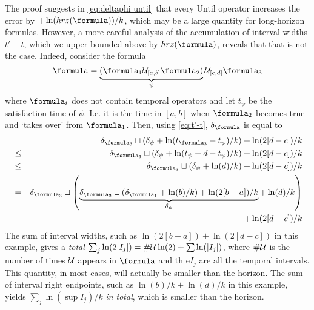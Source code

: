 \begin{rem}
	The proof suggests in \eqref{eq:deltaphi until} that every Until operator increases the error by $+\ln(hrz(\formula))/k$, which may be a large quantity for long-horizon formulas.
	However, a more careful analysis of the accumulation of interval widths $t'-t$, which we upper bounded above by $hrz(\formula)$, reveals that that is not the case.
	Indeed, consider the formula
	\[\formula = \underbrace{(\formula_1 \until_{[a,b]} \formula_2) }_{\psi}\until_{[c,d]} \formula_3\]
	where $\formula_i$ does not contain temporal operators and let $t_\psi$ be the satisfaction time of $\psi$. 
	I.e. it is the time in $[a,b]$ when $\formula_2$ becomes true and `takes over' from $\formula_1$.
	Then, using \eqref{eq:t'-t}, $\delta_{\formula}$ is equal to
	\begin{eqnarray*}
	 && \delta_{\formula_3} \sqcup ( \delta_{\psi} + \ln(t_{\formula_3} - t_\psi)/k )+ \ln(2[d-c])/k 
	\\
	&\leq& \delta_{\formula_3} \sqcup ( \delta_{\psi} + \ln(t_\psi + d - t_\psi)/k )+ \ln(2[d-c])/k 
	\\
	&\leq& \delta_{\formula_3} \sqcup ( \delta_{\psi} + \ln(d)/k )+ \ln(2[d-c])/k 
	\\
	&=& \delta_{\formula_3} \sqcup \left( \underbrace{\delta_{\formula_2} \sqcup ( \delta_{\formula_1} + \ln(b)/k )+ \ln(2[b-a])/k }_{\delta_\psi} + \ln(d)/k \right)
	\\
	&& \quad + \ln(2[d-c])/k 
	\end{eqnarray*}
	The sum of interval widths, such as $\ln(2[b-a])+\ln(2[d-c])$ in this example, gives a \textit{total} $\sum_j\ln(2|I_j|) = \#\mathcal{U}\ln(2) +  \sum\ln(|I_j|)$, where $\#\mathcal{U}$ is the number of times $\mathcal{U}$ appears in $\formula$ and th e$I_j$ are all the temporal intervals. 
	This quantity, in most cases, will actually be smaller than the horizon.
	The sum of interval right endpoints, such as $\ln(b)/k + \ln(d)/k$ in this example, yields $\sum_j \ln(\sup I_j)/k$ \textit{in total}, which is smaller than the horizon.
\end{rem}
